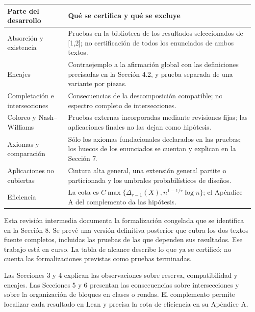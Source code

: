 \documentclass[spanish,11pt,a4paper]{article}
\begin{document}
{\begin{longtable}[]{@{}
  >{\raggedright\arraybackslash}p{}
  >{\raggedright\arraybackslash}p{}@{}}
\toprule\noalign{}
\begin{minipage}[b]{\linewidth}\raggedright
Parte del desarrollo
\end{minipage} & \begin{minipage}[b]{\linewidth}\raggedright
Qué se certifica y qué se excluye
\end{minipage} \\
\midrule\noalign{}
\endhead
\bottomrule\noalign{}
\endlastfoot
Absorción y existencia & Pruebas en la biblioteca de los resultados seleccionados de {[}1,2{]}; no certificación de todos los enunciados de ambos textos. \\
Encajes & Contraejemplo a la afirmación global con las definiciones precisadas en la Sección 4.2, y prueba separada de una variante por piezas. \\
Completación e intersecciones & Consecuencias de la descomposición compatible; no espectro completo de intersecciones. \\
Coloreo y Nash--Williams & Pruebas externas incorporadas mediante revisiones fijas; las aplicaciones finales no las dejan como hipótesis. \\
Axiomas y comparación & Sólo los axiomas fundacionales declarados en las pruebas; los huecos de los enunciados se cuentan y explican en la Sección 7. \\
Aplicaciones no cubiertas & Cintura alta general, una extensión general partite o particionada y los umbrales probabilísticos de diseños. \\
Eficiencia & La cota es \(C\max\{\Delta_{r-1}(X),n^{1-1/r}\log n\}\); el Apéndice A del complemento da las hipótesis. \\
\end{longtable}
}

Esta revisión intermedia documenta la formalización congelada que se identifica en la Sección 8. Se prevé una versión definitiva posterior que cubra los dos textos fuente completos, incluidas las pruebas de las que dependen sus resultados. Ese trabajo está en curso. La tabla de alcance describe lo que ya se certificó; no cuenta las formalizaciones previstas como pruebas terminadas.

Las Secciones 3 y 4 explican las observaciones sobre reserva, compatibilidad y encajes. Las Secciones 5 y 6 presentan las consecuencias sobre intersecciones y sobre la organización de bloques en clases o rondas. El complemento permite localizar cada resultado en Lean y precisa la cota de eficiencia en su Apéndice A.
\end{document}
